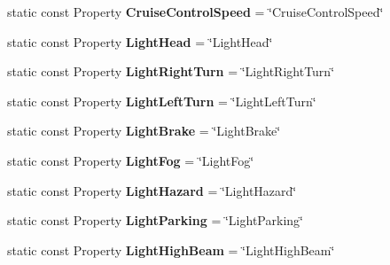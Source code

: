 \begin{DoxyCompactItemize}
\item 
\hypertarget{classVehicleProperty_a50c00b5a2d7cfd500a1cd7473124c737}{static const Property {\bfseries Cruise\-Control\-Speed} = \char`\"{}Cruise\-Control\-Speed\char`\"{}}\label{classVehicleProperty_a50c00b5a2d7cfd500a1cd7473124c737}

\item 
\hypertarget{classVehicleProperty_ae98356a8b49f28837a94b13094156e90}{static const Property {\bfseries Light\-Head} = \char`\"{}Light\-Head\char`\"{}}\label{classVehicleProperty_ae98356a8b49f28837a94b13094156e90}

\item 
\hypertarget{classVehicleProperty_a73cfc2a3afd2dc81f495936dfcf46793}{static const Property {\bfseries Light\-Right\-Turn} = \char`\"{}Light\-Right\-Turn\char`\"{}}\label{classVehicleProperty_a73cfc2a3afd2dc81f495936dfcf46793}

\item 
\hypertarget{classVehicleProperty_a4430db4d7c36d7d047766d88f9fc977c}{static const Property {\bfseries Light\-Left\-Turn} = \char`\"{}Light\-Left\-Turn\char`\"{}}\label{classVehicleProperty_a4430db4d7c36d7d047766d88f9fc977c}

\item 
\hypertarget{classVehicleProperty_aa4f2ae234bd0d045b95cf9980e980dd5}{static const Property {\bfseries Light\-Brake} = \char`\"{}Light\-Brake\char`\"{}}\label{classVehicleProperty_aa4f2ae234bd0d045b95cf9980e980dd5}

\item 
\hypertarget{classVehicleProperty_a6eb38fc244331a26b487f7f9beb69b0c}{static const Property {\bfseries Light\-Fog} = \char`\"{}Light\-Fog\char`\"{}}\label{classVehicleProperty_a6eb38fc244331a26b487f7f9beb69b0c}

\item 
\hypertarget{classVehicleProperty_a0d3992f2e0e50bb74baa5e670f6111f0}{static const Property {\bfseries Light\-Hazard} = \char`\"{}Light\-Hazard\char`\"{}}\label{classVehicleProperty_a0d3992f2e0e50bb74baa5e670f6111f0}

\item 
\hypertarget{classVehicleProperty_a144920830af1df5a59433f98ebd29504}{static const Property {\bfseries Light\-Parking} = \char`\"{}Light\-Parking\char`\"{}}\label{classVehicleProperty_a144920830af1df5a59433f98ebd29504}

\item 
\hypertarget{classVehicleProperty_acce36f505d4b0233c753f0d5f568e255}{static const Property {\bfseries Light\-High\-Beam} = \char`\"{}Light\-High\-Beam\char`\"{}}\label{classVehicleProperty_acce36f505d4b0233c753f0d5f568e255}


\end{DoxyCompactItemize}
